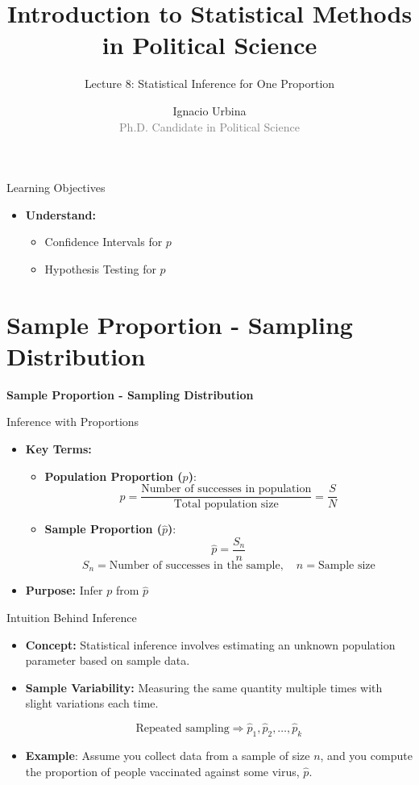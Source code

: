 \documentclass[handout]{beamer} %
\title{Introduction to Statistical Methods in Political Science}
\subtitle{Lecture 8: Statistical Inference for One Proportion}
\author{Ignacio Urbina \texorpdfstring{\\ \vspace{0.3em}}{ } \scriptsize \textcolor{gray}{Ph.D. Candidate in Political Science}}
\date{}
\newcommand{\transitionslide}[1]{
    \begin{frame}[plain]
        \centering
        \vspace{1cm}
        \Huge
        \textcolor{moonstoneblue!150}{\textbf{#1}}
    \end{frame}
}
\begin{document}
\begin{frame}
    \titlepage
\end{frame}

\begin{frame}{Learning Objectives}
    \begin{itemize}
        \item \textbf{Understand:}
        \begin{itemize}
            \item Confidence Intervals for \( p \)
            \item Hypothesis Testing for \( p \)
        \end{itemize}
    \end{itemize}
\end{frame}

\section{Sample Proportion - Sampling Distribution}
\transitionslide{Sample Proportion - Sampling Distribution}

\begin{frame}{Inference with Proportions}
    \begin{itemize}
        \item \textbf{Key Terms:}
        \begin{itemize}
            \item \textbf{Population Proportion (\( p \))}: 
            \[
                p = \frac{\text{Number of successes in population}}{\text{Total population size}} = \frac{S}{N}
            \]
            \item \textbf{Sample Proportion (\( \hat{p} \))}: 
            \[
                \hat{p} = \frac{S_n}{n}
            \]
            \[
               S_n= \text{Number of successes in the sample}, \quad n = \text{Sample size}
            \]
        \end{itemize}
        \item \textbf{Purpose:} Infer \( p \) from \( \hat{p} \)
    \end{itemize}
\end{frame}

\begin{frame}{Intuition Behind Inference}
    \begin{itemize}
        \item \textbf{Concept:} Statistical inference involves estimating an unknown population parameter based on sample data.
        \item \textbf{Sample Variability:} Measuring the same quantity multiple times with slight variations each time.

    \[
        \text{Repeated sampling} \Rightarrow \hat{p}_1, \hat{p}_2, \ldots, \hat{p}_k
    \]
    \item \textbf{Example}: Assume you collect data from a sample of size $n$, and you compute the proportion of people vaccinated against some virus, $\hat{p}$.
    \end{itemize}
\end{frame}
\end{document}
